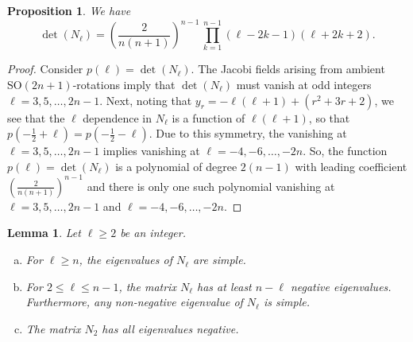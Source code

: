 \documentclass[11pt]{article}
\newcommand{\SO}{\mathrm{SO}}
\newtheorem{prop}[thm]{Proposition}
\newtheorem{lem}[thm]{Lemma}
\theoremstyle{definition}
\numberwithin{equation}{section}
\begin{document}
\begin{prop}
    We have
    \begin{equation}\label{eq:detform}
        \det (N_\ell) = \left( \frac{2}{n(n+1)} \right)^{n-1} \,\prod_{k=1}^{n-1} (\ell - 2k - 1) (\ell + 2k + 2).
    \end{equation}
\end{prop}
\begin{proof}
    {Consider $p(\ell) = \det(N_\ell)$.  The Jacobi fields arising from ambient $\SO(2n+1)$-rotations imply that $\det(N_\ell)$ must vanish at odd integers $\ell = 3, 5, \ldots, 2n-1$.  Next, noting that $y_r = -\ell(\ell+1) + (r^2 + 3r + 2)$, we see that the $\ell$ dependence in $N_\ell$ is a function of $\ell(\ell+1)$, so that $p(-\frac{1}{2} + \ell) = p(-\frac{1}{2} - \ell)$.  Due to this symmetry, the vanishing at $\ell = 3, 5, \ldots, 2n-1$ implies vanishing at $\ell = -4, -6, \ldots, -2n$.  So, the function $p(\ell) = \det (N_\ell)$ is a polynomial of degree $2(n-1)$ with leading coefficient $(\frac{2}{n(n+1)})^{n-1}$ and there is only one such polynomial vanishing at $\ell = 3, 5, \ldots, 2n-1$ and $\ell = -4, -6, \ldots, -2n$.}
\end{proof}

\begin{lem}   \label{lem:simpevals} Let $\ell \geq 2$ be an integer.
\begin{enumerate}[(a)]
\item For $\ell \geq n$, the eigenvalues of $N_\ell$ are simple.
\item For $2 \leq \ell \leq n-1$, the matrix $N_\ell$ has at least $n - \ell$ negative eigenvalues.  Furthermore, any non-negative eigenvalue of $N_\ell$ is simple.
\item The matrix $N_2$ has all eigenvalues negative.
\end{enumerate}
\end{lem}
\end{document}
